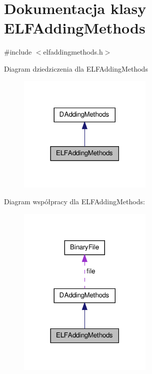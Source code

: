 \hypertarget{class_e_l_f_adding_methods}{\section{Dokumentacja klasy E\-L\-F\-Adding\-Methods}
\label{class_e_l_f_adding_methods}
}


{\ttfamily \#include $<$elfaddingmethods.\-h$>$}



Diagram dziedziczenia dla E\-L\-F\-Adding\-Methods\nopagebreak
\begin{figure}[H]
\begin{center}
\leavevmode
\includegraphics[width=182pt]{class_e_l_f_adding_methods__inherit__graph}
\end{center}
\end{figure}


Diagram współpracy dla E\-L\-F\-Adding\-Methods\-:\nopagebreak
\begin{figure}[H]
\begin{center}
\leavevmode
\includegraphics[width=182pt]{class_e_l_f_adding_methods__coll__graph}
\end{center}
\end{figure}
